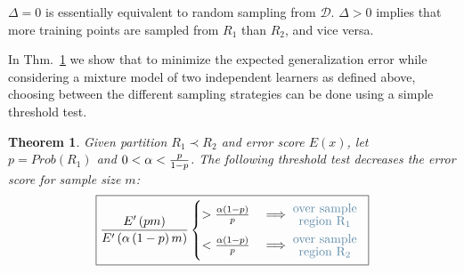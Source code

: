 \documentclass{article}
\newcommand{\Dd}{\mathcal{D}}
\newcommand{\pR}{1}\newcommand{\rR}{2}\newcommand{\prR}{i}
\newcommand{\qDel}{\Delta}
\newcommand{\hlt}[1]{{\color{airforceblue} #1}}
\newcommand{\texq}[1]{\hspace{-1.5em}\mathrm{\hlt{#1}}}
\newtheorem{theorem}{Theorem}
\begin{document}
$\qDel=0$ is essentially equivalent to random sampling from $\Dd$.
$\qDel>0$ implies that more training points are sampled from $R_\pR$ than $R_\rR$, and vice versa.

In Thm.~\ref{thm:threshold_test} we show that to minimize the expected generalization error while considering a mixture model of two independent learners as defined above, choosing between the different sampling strategies can be done using a simple threshold test. 

\begin{theorem}
\label{thm:threshold_test}
Given partition $R_\pR\prec R_\rR$ and error score $E(x)$, let $p=Prob(R_\pR)$ and $0<\alpha<\frac{p}{1-p}$. The following threshold test decreases the error score for sample size $m$:
\begin{equation*}
\boxed{
\frac{E'\left(pm\right)}{E'\left(\qhard\left(1-p\right)m\right)} 
\begin{cases} > \frac{\qhard\left(1-p\right)}{p}&\implies \begin{array}{cc}&\texq{over~sample}\vspace{-.15cm}\\  &\texq{region~R_\pR} \end{array} \\
< \frac{\qhard\left(1-p\right)}{p}&\implies \begin{array}{cc}&\texq{over~sample}\vspace{-.15cm}\\  &\texq{region~R_\rR} \end{array}
\end{cases}
}
\end{equation*}
\end{theorem}
\end{document}
